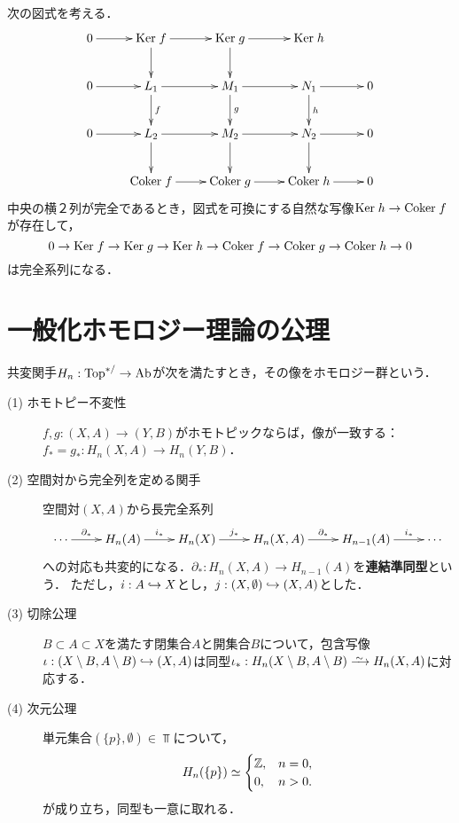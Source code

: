 \documentclass[uplatex,dvipdfmx]{jsreport}
\begin{document}
\begin{lemma}
    次の図式を考える．
    \[\xymatrix{
        0\ar[r]&\Ker f\ar[d]\ar[r]&\Ker g\ar[d]\ar[r]&\Ker h\\
        0\ar[r]&L_1\ar[d]^-f\ar[r]&M_1\ar[r]\ar[d]^-g&N_1\ar[r]\ar[d]^-h&0\\
        0\ar[r]&L_2\ar[d]\ar[r]&M_2\ar[d]\ar[r]&N_2\ar[d]\ar[r]&0\\
            &\Coker f\ar[r]&\Coker g\ar[r]&\Coker h\ar[r]&0
    }\]
    中央の横２列が完全であるとき，図式を可換にする自然な写像$\mathrm{Ker}\; h\to\mathrm{Coker}\; f$が存在して，
    \[0\to\mathrm{Ker}\; f\to\mathrm{Ker}\; g\to\mathrm{Ker}\; h\to\mathrm{Coker}\; f\to\mathrm{Coker}\; g\to\mathrm{Coker}\; h\to0\]
    は完全系列になる．
\end{lemma}

\section{一般化ホモロジー理論の公理}

\begin{axiom}
    共変関手$H_n:\mathrm{Top}^{*/}\to\mathrm{Ab}$が次を満たすとき，その像をホモロジー群という．
    \begin{description}
        \item[(1) ホモトピー不変性] $f,g:(X,A)\to (Y,B)$がホモトピックならば，像が一致する：$f_*=g_*:H_n(X,A)\to H_n(Y,B)$．
        \item[(2) 空間対から完全列を定める関手] 空間対$(X,A)$から長完全系列
        \[\xymatrix@R-1pc{
            \cdots\ar[r]^-{\partial_*}&H_n(A)\ar[r]^-{i_*}&H_n(X)\ar[r]^-{j_*}&H_n(X,A)\ar[r]^-{\partial_*}&H_{n-1}(A)\ar[r]^-{i_*}&\cdots
        }\]
        への対応も共変的になる．$\partial_*:H_n(X,A)\to H_{n-1}(A)$を\textbf{連結準同型}という．
        ただし，$i:A\hookrightarrow X$とし，$j:(X,\emptyset)\hookrightarrow(X,A)$とした．
        \item[(3) 切除公理] $B\subset A\subset X$を満たす閉集合$A$と開集合$B$について，包含写像$\iota:(X\setminus B,A\setminus B)\hookrightarrow (X,A)$は同型$\iota_*:H_n(X\setminus B,A\setminus B)\iso H_n(X,A)$に対応する．
        \item[(4) 次元公理] 単元集合$(\{p\},\emptyset)\in\Top$について，
        \[H_n(\{p\})\simeq
        \begin{cases}
            \mathbb{Z},&n=0,\\
            0,&n>0.
        \end{cases}\]
        が成り立ち，同型も一意に取れる．
    \end{description}
\end{axiom}
\end{document}
